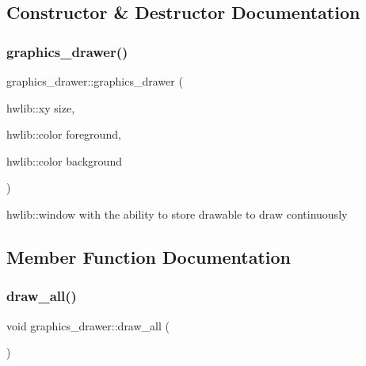 \subsection{Constructor \& Destructor Documentation}
\mbox{\label{classgraphics__drawer_a76168c68029e863f1ad09b5dc558719e}} 
\subsubsection{\texorpdfstring{graphics\+\_\+drawer()}{graphics\_drawer()}}
{\footnotesize\ttfamily graphics\+\_\+drawer\+::graphics\+\_\+drawer (\begin{DoxyParamCaption}\item[{hwlib\+::xy}]{size,  }\item[{hwlib\+::color}]{foreground,  }\item[{hwlib\+::color}]{background }\end{DoxyParamCaption})\hspace{0.3cm}{\ttfamily [inline]}}



hwlib\+::window with the ability to store drawable to draw continuously 



\subsection{Member Function Documentation}
\mbox{\label{classgraphics__drawer_a6c14eee0dd24900ba8aa924034b1bc60}} 
\subsubsection{\texorpdfstring{draw\+\_\+all()}{draw\_all()}}
{\footnotesize\ttfamily void graphics\+\_\+drawer\+::draw\+\_\+all (\begin{DoxyParamCaption}{ }\end{DoxyParamCaption})}

\mbox{\label{classgraphics__drawer_a44a2871ef32f5b9acccd7bac7d1137dd}} 
